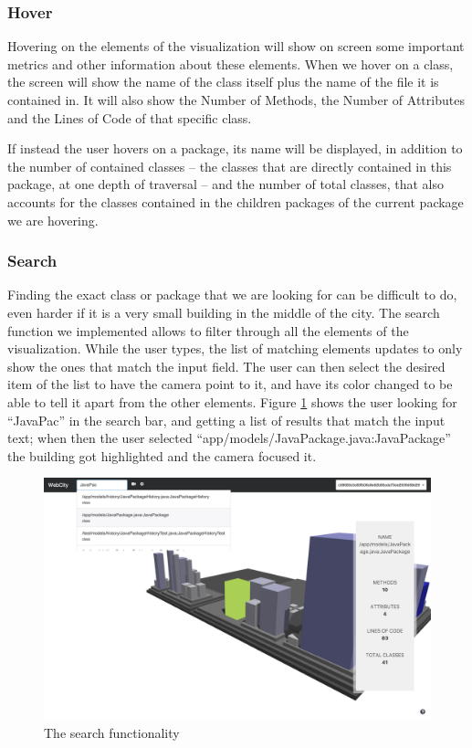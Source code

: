 \documentclass[]{usiinfbachelorproject}
\begin{document}
\subsubsection{Hover} \label{Hover}
Hovering on the elements of the visualization will show on screen some important metrics and other information about these elements.
When we hover on a class, the screen will show the name of the class itself plus the name of the file it is contained in. It will also show the Number of Methods,
 the Number of Attributes and the Lines of Code of that specific class.

 If instead the user hovers on a package, its name will be displayed, in addition to the number of contained classes -- the classes that are directly contained in this package, at one depth of traversal --
  and the number of total classes, that also accounts for the classes contained in the children packages of the current package we are hovering.

\subsubsection{Search} \label{Search}
Finding the exact class or package that we are looking for can be difficult to do, even harder if it is a very small building in the middle of the city.
The search function we implemented allows to filter through all the elements of the visualization. While the user types,
the list of matching elements updates to only show the ones that match the input field. The user can then select the desired item of the list to have the camera point to it,
and have its color changed to be able to tell it apart from the other elements.
Figure \ref{fig:search} shows the user looking for ``JavaPac'' in the search bar, and getting a list of results that match the input text; when then the user selected ``app/models/JavaPackage.java:JavaPackage'' the building got highlighted and the camera focused it.

\begin{figure} [H]
\centering
\includegraphics[width=1\textwidth]{pictures/search.png}
\caption{The search functionality}
\label{fig:search}
\end{figure}
\end{document}
